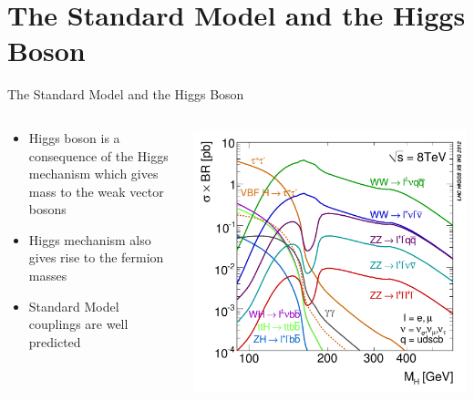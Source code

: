 \documentclass{beamer}
\begin{document}
\section{The Standard Model and the Higgs Boson}
\begin{frame}{The Standard Model and the Higgs Boson}
  \begin{columns}
    \begin{column}{.6\textwidth}
      \begin{itemize}
      \item Higgs boson is a consequence of the Higgs mechanism which gives mass to the weak vector bosons
      \item Higgs mechanism also gives rise to the fermion masses
      \item Standard Model couplings are well predicted
      \end{itemize}
    \end{column}
    \begin{column}{.4\textwidth}
      \begin{minipage}{\textwidth}
        \includegraphics[width=\textwidth]{XSBR_8TeV_SM.pdf}
      \end{minipage}
    \end{column}
  \end{columns}
\end{frame}
\end{document}
